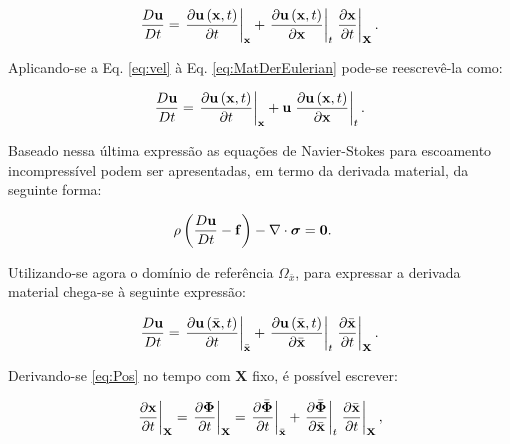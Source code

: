 \documentclass[tese_patricia]{subfiles}%
\begin{document}
\begin{align}
\frac{D\mathbf{u}}{Dt} = \left. \frac{\partial\mathbf{u}\left(\mathbf{x},t\right)}{\partial t} \right|_\mathbf{x} + \left. \frac{\partial\mathbf{u}\left(\mathbf{x},t\right)}{\partial \mathbf{x}} \right|_{t} \left. \frac{\partial\mathbf{x}}{\partial t} \right|_{\mathbf{X}}. \label{eq:MatDerEulerian}
\end{align}

Aplicando-se a Eq. \eqref{eq:vel} à Eq. \eqref{eq:MatDerEulerian} pode-se reescrevê-la como:

\begin{align}
\frac{D\mathbf{u}}{Dt} = \left. \frac{\partial\mathbf{u}\left(\mathbf{x},t\right)}{\partial t} \right|_\mathbf{x} + \mathbf{u} \left. \frac{\partial\mathbf{u}\left(\mathbf{x},t\right)}{\partial \mathbf{x}} \right|_{t}. \label{eq:MatDerEulerianUp}
\end{align}

Baseado nessa última expressão as equações de Navier-Stokes para escoamento incompressível podem ser apresentadas, em termo da derivada material, da seguinte forma:

\begin{align}
\rho\left(\frac{D\mathbf{u}}{Dt} - \mathbf{f} \right) - \nabla \cdot \boldsymbol{\sigma} &= \mathbf{0}. \label{Navier-Stokes-MatDerEuleriana}
\end{align}

Utilizando-se agora o domínio de referência $\Omega_{\bar{x}}$, para expressar a derivada material chega-se à seguinte expressão:

\begin{align}
\frac{D\mathbf{u}}{Dt} = \left. \frac{\partial\mathbf{u}\left(\bar{\mathbf{x}},t\right)}{\partial t} \right|_{\bar{\mathbf{x}}} + \left. \frac{\partial\mathbf{u}\left(\bar{\mathbf{x}},t\right)}{\partial \bar{\mathbf{x}}} \right|_{t} \left. \frac{\partial\bar{\mathbf{x}}}{\partial t} \right|_{\mathbf{X}}. \label{eq:MatDerALE}
\end{align}
%

Derivando-se \eqref{eq:Pos} no tempo com $\mathbf{X}$ fixo, é possível escrever:

\begin{align}
\left. \frac{\partial \mathbf{x}}{\partial t} \right|_{\mathbf{X}} = \left . \frac{\partial \mathbf{\Phi}}{\partial t} \right|_{\mathbf{X}} =   \left . \frac{\partial \bar{\mathbf{\Phi}}}{\partial t} \right|_{\bar{\mathbf{x}}} + \left . \frac{\partial \bar{\mathbf{\Phi}}}{\partial \bar{\mathbf{x}}} \right|_{t} \left . \frac{\partial \bar{\mathbf{x}}}{\partial t} \right|_{\mathbf{X}},
\end{align}
\end{document}
